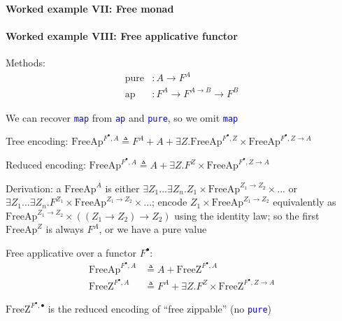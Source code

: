 \paragraph{Worked example VII: Free monad}


\paragraph{Worked example VIII: Free applicative functor}

Methods:
\begin{align*}
\text{pure} & :A\rightarrow F^{A}\\
\text{ap} & :F^{A}\rightarrow F^{A\rightarrow B}\rightarrow F^{B}
\end{align*}

We can recover \texttt{\textcolor{blue}{\footnotesize{}map}} from
\texttt{\textcolor{blue}{\footnotesize{}ap}} and \texttt{\textcolor{blue}{\footnotesize{}pure}},
so we omit \texttt{\textcolor{blue}{\footnotesize{}map}} 

Tree encoding: {\footnotesize{}$\text{FreeAp}^{F^{\bullet},A}\triangleq F^{A}+A+\exists Z.\text{FreeAp}^{F^{\bullet},Z}\times\text{FreeAp}^{F^{\bullet},Z\rightarrow A}$}{\footnotesize\par}

Reduced encoding:{\footnotesize{} $\text{FreeAp}^{F^{\bullet},A}\triangleq A+\exists Z.F^{Z}\times\text{FreeAp}^{F^{\bullet},Z\rightarrow A}$}{\footnotesize\par}

Derivation: a $\text{FreeAp}^{A}$ is either $\exists Z_{1}...\exists Z_{n}.Z_{1}\times\text{FreeAp}^{Z_{1}\rightarrow Z_{2}}\times...$
or $\exists Z_{1}...\exists Z_{n}.F^{Z_{1}}\times\text{FreeAp}^{Z_{1}\rightarrow Z_{2}}\times...$;
encode $Z_{1}\times\text{FreeAp}^{Z_{1}\rightarrow Z_{2}}$ equivalently
as $\text{FreeAp}^{Z_{1}\rightarrow Z_{2}}\times\left(\left(Z_{1}\rightarrow Z_{2}\right)\rightarrow Z_{2}\right)$
using the identity law; so the first $\text{FreeAp}^{Z}$ is always
$F^{A}$, or we have a pure value 

Free applicative over a functor $F^{\bullet}$: 
\begin{align*}
\text{FreeAp}^{F^{\bullet},A} & \triangleq A+\text{FreeZ}^{F^{\bullet},A}\\
\text{FreeZ}^{F^{\bullet},A} & \triangleq F^{A}+\exists Z.F^{Z}\times\text{FreeZ}^{F^{\bullet},Z\rightarrow A}
\end{align*}

$\text{FreeZ}^{F^{\bullet},\bullet}$ is the reduced encoding of \textsf{``}free
zippable\textsf{''} (no \texttt{\textcolor{blue}{\footnotesize{}pure}})

